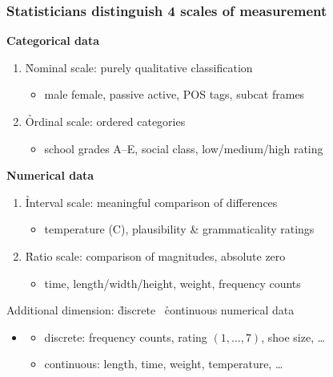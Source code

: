 \documentclass[t]{beamer} %
\begin{document}
\begin{frame}
  \frametitle{Statisticians distinguish 4 scales of measurement}

  \textbf{Categorical data}
  \begin{enumerate}
  \item<2->[1.] \h{Nominal scale}: purely qualitative classification
    \begin{itemize}
    \item male \vs female, passive \vs active, POS tags, subcat frames
    \end{itemize}
  \item<3->[2.] \h{Ordinal scale}: ordered categories
    \begin{itemize}
    \item school grades A--E, social class, low/medium/high rating
    \end{itemize}
  \end{enumerate}

  \gap[.5]
  \textbf{Numerical data}
  \begin{enumerate}
  \item<4->[3.] \h{Interval scale}: meaningful comparison of differences
    \begin{itemize}
    \item temperature (\textdegree C), plausibility \& grammaticality ratings
    \end{itemize}
  \item<5->[4.] \h{Ratio scale}: comparison of magnitudes, absolute zero
    \begin{itemize}
    \item time, length/width/height, weight, frequency counts
    \end{itemize}
  \end{enumerate}

  \gap[.5]
  Additional dimension: \h{discrete} \vs\ \h{continuous} numerical data
  \begin{itemize}
  \item[]
    \begin{itemize}
    \item discrete: frequency counts, rating $(1, \ldots, 7)$, shoe size, \ldots
    \item continuous: length, time, weight, temperature, \ldots
    \end{itemize}
  \end{itemize}
\end{frame}
\end{document}
